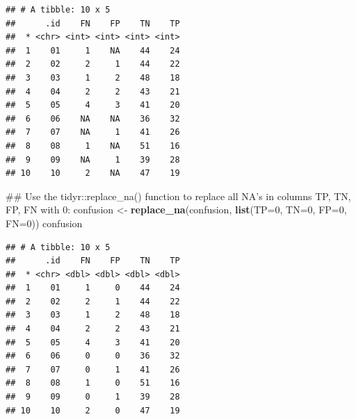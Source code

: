 \documentclass[]{article}
\newenvironment{Shaded}{\begin{snugshade}}{\end{snugshade}}
\newcommand{\KeywordTok}[1]{\textcolor[rgb]{0.13,0.29,0.53}{\textbf{#1}}}
\newcommand{\DataTypeTok}[1]{\textcolor[rgb]{0.13,0.29,0.53}{#1}}
\newcommand{\DecValTok}[1]{\textcolor[rgb]{0.00,0.00,0.81}{#1}}
\newcommand{\StringTok}[1]{\textcolor[rgb]{0.31,0.60,0.02}{#1}}
\newcommand{\OperatorTok}[1]{\textcolor[rgb]{0.81,0.36,0.00}{\textbf{#1}}}
\newcommand{\NormalTok}[1]{#1}
\begin{document}
\begin{verbatim}
## # A tibble: 10 x 5
##      .id    FN    FP    TN    TP
##  * <chr> <int> <int> <int> <int>
##  1    01     1    NA    44    24
##  2    02     2     1    44    22
##  3    03     1     2    48    18
##  4    04     2     2    43    21
##  5    05     4     3    41    20
##  6    06    NA    NA    36    32
##  7    07    NA     1    41    26
##  8    08     1    NA    51    16
##  9    09    NA     1    39    28
## 10    10     2    NA    47    19
\end{verbatim}

\begin{Shaded}
\begin{Highlighting}[]
\NormalTok{## Use the tidyr::replace_na() function to replace all NA's in columns TP, TN, FP, FN with 0:}
\NormalTok{confusion <-}\StringTok{ }\KeywordTok{replace_na}\NormalTok{(confusion, }\KeywordTok{list}\NormalTok{(}\DataTypeTok{TP=}\DecValTok{0}\NormalTok{, }\DataTypeTok{TN=}\DecValTok{0}\NormalTok{, }\DataTypeTok{FP=}\DecValTok{0}\NormalTok{, }\DataTypeTok{FN=}\DecValTok{0}\NormalTok{))}
\NormalTok{confusion}
\end{Highlighting}
\end{Shaded}

\begin{verbatim}
## # A tibble: 10 x 5
##      .id    FN    FP    TN    TP
##  * <chr> <dbl> <dbl> <dbl> <dbl>
##  1    01     1     0    44    24
##  2    02     2     1    44    22
##  3    03     1     2    48    18
##  4    04     2     2    43    21
##  5    05     4     3    41    20
##  6    06     0     0    36    32
##  7    07     0     1    41    26
##  8    08     1     0    51    16
##  9    09     0     1    39    28
## 10    10     2     0    47    19
\end{verbatim}

\begin{Shaded}
\end{Shaded}
\end{document}
